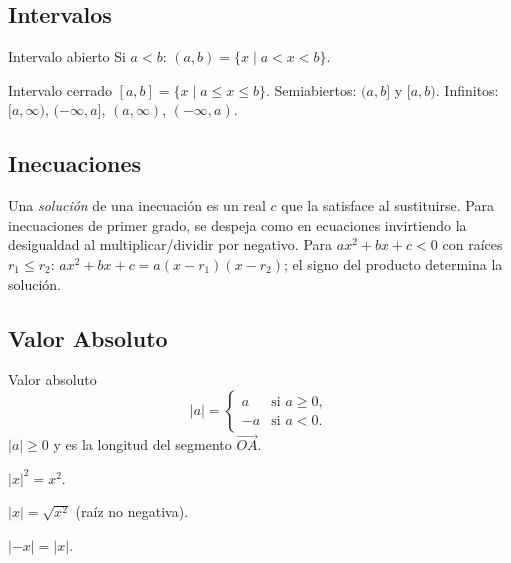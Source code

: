 \documentclass[12pt]{article}
\begin{document}
\subsection{Intervalos}

\begin{definicion}[]{Intervalo abierto}
Si $a < b$: $(a,b) = \{x \mid a < x < b\}$.
\end{definicion}

\begin{definicion}[]{Intervalo cerrado}
$[a,b] = \{x \mid a \leq x \leq b\}$. Semiabiertos: $(a,b]$ y $[a,b)$. Infinitos: $[a,\infty)$, $(-\infty,a]$, $(a,\infty)$, $(-\infty,a)$.
\end{definicion}

\subsection{Inecuaciones}

Una \textit{solución} de una inecuación es un real $c$ que la satisface al sustituirse. Para inecuaciones de primer grado, se despeja como en ecuaciones invirtiendo la desigualdad al multiplicar/dividir por negativo. Para $ax^2+bx+c < 0$ con raíces $r_1 \leq r_2$: $ax^2+bx+c = a(x-r_1)(x-r_2)$; el signo del producto determina la solución.

\subsection{Valor Absoluto}

\begin{definicion}[]{Valor absoluto}
\[ |a| = \begin{cases} a & \text{si } a \geq 0, \\ -a & \text{si } a < 0. \end{cases} \]
$|a| \geq 0$ y es la longitud del segmento $\overrightarrow{OA}$.
\end{definicion}

\begin{proposicion}[1]{}
$|x|^2 = x^2$.
\end{proposicion}

\begin{proposicion}[2]{}
$|x| = \sqrt{x^2}$ (raíz no negativa).
\end{proposicion}

\begin{proposicion}[3]{}
$|-x| = |x|$.
\end{proposicion}
\end{document}
